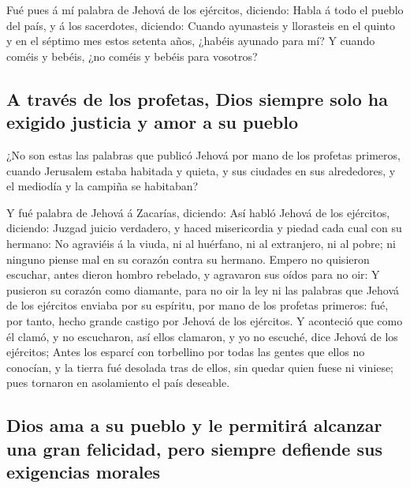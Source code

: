  Fué pues á mí palabra de Jehová de los ejércitos,
diciendo:  Habla á todo el pueblo del país, y á los
sacerdotes, diciendo: Cuando ayunasteis y llorasteis en el quinto y en
el séptimo mes estos setenta años, ¿habéis ayunado para mí?
 Y cuando coméis y bebéis, ¿no coméis y bebéis para
vosotros?

\hypertarget{a-travuxe9s-de-los-profetas-dios-siempre-solo-ha-exigido-justicia-y-amor-a-su-pueblo}{%
\subsection{A través de los profetas, Dios siempre solo ha exigido
justicia y amor a su
pueblo}\label{a-travuxe9s-de-los-profetas-dios-siempre-solo-ha-exigido-justicia-y-amor-a-su-pueblo}}

 ¿No son estas las palabras que publicó Jehová por mano de
los profetas primeros, cuando Jerusalem estaba habitada y quieta, y sus
ciudades en sus alrededores, y el mediodía y la campiña se habitaban?

 Y fué palabra de Jehová á Zacarías, diciendo:
 Así habló Jehová de los ejércitos, diciendo: Juzgad
juicio verdadero, y haced misericordia y piedad cada cual con su
hermano:  No agraviéis á la viuda, ni al huérfano, ni al
extranjero, ni al pobre; ni ninguno piense mal en su corazón contra su
hermano.  Empero no quisieron escuchar, antes dieron
hombro rebelado, y agravaron sus oídos para no oir:  Y
pusieron su corazón como diamante, para no oir la ley ni las palabras
que Jehová de los ejércitos enviaba por su espíritu, por mano de los
profetas primeros: fué, por tanto, hecho grande castigo por Jehová de
los ejércitos.  Y aconteció que como él clamó, y no
escucharon, así ellos clamaron, y yo no escuché, dice Jehová de los
ejércitos;  Antes los esparcí con torbellino por todas
las gentes que ellos no conocían, y la tierra fué desolada tras de
ellos, sin quedar quien fuese ni viniese; pues tornaron en asolamiento
el país deseable.

\hypertarget{dios-ama-a-su-pueblo-y-le-permitiruxe1-alcanzar-una-gran-felicidad-pero-siempre-defiende-sus-exigencias-morales}{%
\subsection{Dios ama a su pueblo y le permitirá alcanzar una gran
felicidad, pero siempre defiende sus exigencias
morales}\label{dios-ama-a-su-pueblo-y-le-permitiruxe1-alcanzar-una-gran-felicidad-pero-siempre-defiende-sus-exigencias-morales}}

